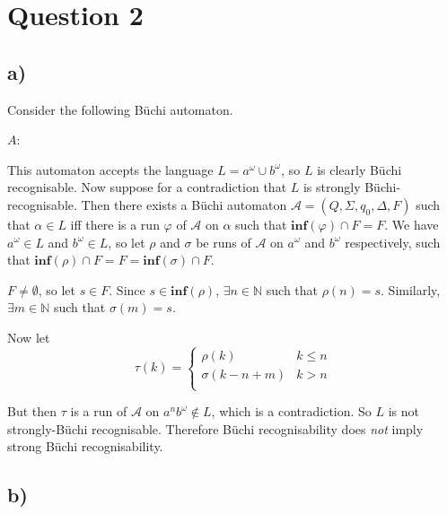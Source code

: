 \documentclass[11pt]{article}
\begin{document}
\section*{Question 2}

\subsection*{a)}

Consider the following B\"uchi automaton.

$A$:


This automaton accepts the language $L = a^\omega \cup b^\omega$, so $L$ is
clearly B\"uchi recognisable. Now suppose for a contradiction that $L$ is
strongly B\"uchi-recognisable. Then there exists a B\"uchi automaton $\mathcal{A} =
(Q, \Sigma, q_0, \Delta, F)$ such that $\alpha \in L $ iff there is a run
$\varphi$ of $\mathcal{A}$ on $\alpha$ such that $\textbf{inf}(\varphi) \cap F
= F$.
We have $a^\omega \in L $ and $b^\omega \in L$, so let $\rho$ and $\sigma$ be
runs of $\mathcal{A}$ on $a^\omega$ and $b^\omega$ respectively, such that
$\textbf{inf}(\rho) \cap F = F = \textbf{inf}(\sigma) \cap F$.

$F \neq \emptyset$, so let $s \in F$. Since $s \in \textbf{inf}(\rho)$,
$\exists n \in \mathbb{N}$ such that $\rho(n) = s$. Similarly, $\exists m \in
\mathbb{N}$ such that $\sigma(m) = s$.

Now let \begin{displaymath}
\tau(k) = \left\{
     \begin{array}{lr}
       \rho(k) &   k \leq n \\
       \sigma(k-n+m) & k > n \\
     \end{array}
   \right.
   \end{displaymath}

But then $\tau$ is a run of $\mathcal{A}$ on $a^n b^\omega \notin L$, which is
a contradiction. So $L$ is not strongly-B\"uchi recognisable.
Therefore B\"uchi recognisability does \emph{not} imply strong B\"uchi recognisability.

\subsection*{b)}
\end{document}

